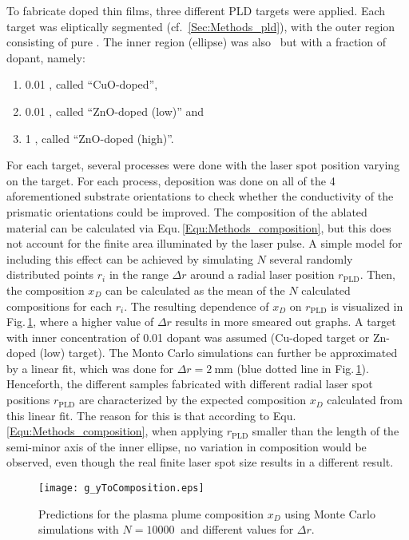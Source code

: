 To fabricate doped thin films, three different PLD targets were applied.
Each target was eliptically segmented (cf.~\ref{Sec:Methods_pld}), with the outer region consisting of pure .
The inner region (ellipse) was also \cro\ but with a fraction of dopant, namely:
\begin{enumerate}
    \item \qty{0.01}{\wtpercent} , called \enquote{CuO-doped},
    \item \qty{0.01}{\wtpercent} , called \enquote{ZnO-doped (low)} and
    \item \qty{1}{\wtpercent} , called \enquote{ZnO-doped (high)}.
\end{enumerate}
For each target, several processes were done with the laser spot position varying on the target.
For each process, deposition was done on all of the 4 aforementioned substrate orientations to check whether the conductivity of the prismatic orientations could be improved.
The composition of the ablated material can be calculated via Equ.\,\ref{Equ:Methods_composition}, but this does not account for the finite area illuminated by the laser pulse.
A simple model for including this effect can be achieved by simulating $N$ several randomly distributed points $r_i$ in the range $\Delta r$ around a radial laser position $r_\mathrm{PLD}$.
Then, the composition $x_D$ can be calculated as the mean of the $N$ calculated compositions for each $r_i$.
The resulting dependence of $x_D$ on $r_\mathrm{PLD}$ is visualized in Fig.\,\ref{Fig:Results_2_yToComposition}, where a higher value of $\Delta r$ results in more smeared out graphs.
A target with inner concentration of \qty{0.01}{\wtpercent} dopant was assumed (Cu-doped target or Zn-doped (low) target).
The Monto Carlo simulations can further be approximated by a linear fit, which was done for $\Delta r=\qty{2}{\mm}$ (blue dotted line in Fig.\,\ref{Fig:Results_2_yToComposition}).
Henceforth, the different samples fabricated with different radial laser spot positions $r_\mathrm{PLD}$ are characterized by the expected composition $x_D$ calculated from this linear fit.
The reason for this is that according to Equ.\,\ref{Equ:Methods_composition}, when applying $r_\mathrm{PLD}$ smaller than the length of the semi-minor axis of the inner ellipse, no variation in composition would be observed, even though the real finite laser spot size results in a different result.
\begin{figure}
    \centering
    \texttt{[image: g\_yToComposition.eps]}
    \caption{
        Predictions for the plasma plume composition $x_D$ using Monte Carlo simulations with $N=\qty{10 000}{}$ and different values for $\Delta r$.
    }
    \label{Fig:Results_2_yToComposition}
\end{figure}

